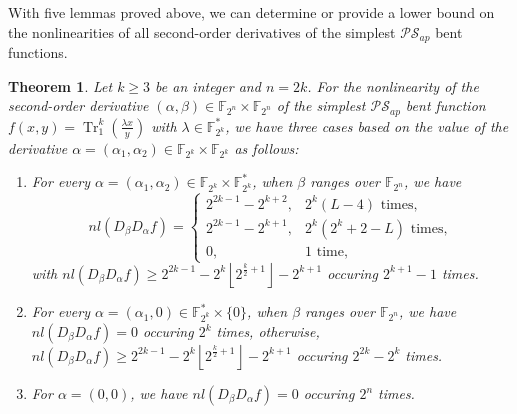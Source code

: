 \documentclass{article}
\newcommand{\F}{\mathbb{F}}
\newcommand{\0}{\textbf{0}}
\newcommand{\1}{\textbf{1}}
\newcommand{\TRACE}{\operatorname{Tr}_1^k}
\theoremstyle{plain}
\newtheorem{theorem}{Theorem}
\begin{document}
    With five lemmas proved above, we can determine or provide a lower bound on the nonlinearities of all second-order derivatives of the simplest $\mathcal{PS}_{ap}$ bent functions.
    \begin{theorem}\label{thm:nl_DaDbf}
        Let $k\ge 3$ be an integer and $n=2k$.
        For the nonlinearity of the second-order derivative $(\alpha,\beta)\in\F_{2^n}\times\F_{2^n}$ of
        the simplest $\mathcal{PS}_{ap}$ bent function $f(x,y)=\TRACE\left(\frac{\lambda x}{y}\right)$ with $\lambda\in\F_{2^k}^*$,
        we have three cases based on the value of the derivative $\alpha=(\alpha_1,\alpha_2)\in\F_{2^k}\times\F_{2^k}$ as follows:
        \begin{enumerate}[label=(\arabic{*})]
            \item For every $\alpha=(\alpha_1,\alpha_2)\in\F_{2^k}\times\F_{2^k}^*$,
            when $\beta$ ranges over $\F_{2^n}$, we have
            \begin{equation}\label{res:nontrivil_nl}
                nl(D_{\beta}D_{\alpha}f)=\begin{cases}
                    2^{2k-1}-2^{k+2},&2^k(L-4)\text{ times},\\
                    2^{2k-1}-2^{k+1},&2^k(2^k+2-L)\text{ times},\\
                    0,&1\text{ time},%
                \end{cases}
            \end{equation}
            with $nl(D_{\beta}D_{\alpha}f)\ge 2^{2k-1}-2^k\left\lfloor 2^{\frac{k}{2}+1}\right\rfloor-2^{k+1}$ occuring $2^{k+1}-1$ times.
            \item For every $\alpha=(\alpha_1,0)\in\F_{2^k}^*\times\{0\}$, when $\beta$ ranges over $\F_{2^n}$,
            we have $nl(D_{\beta}D_{\alpha}f)=0$ occuring $2^k$ times,
            otherwise, $nl(D_{\beta}D_{\alpha}f)\ge 2^{2k-1}-2^k\left\lfloor 2^{\frac{k}{2}+1}\right\rfloor-2^{k+1}$ occuring $2^{2k}-2^k$ times.
            \item For $\alpha=(0,0)$, we have $nl(D_{\beta}D_{\alpha}f) = 0$ occuring $2^n$ times.
        \end{enumerate}
    \end{theorem}
\end{document}
